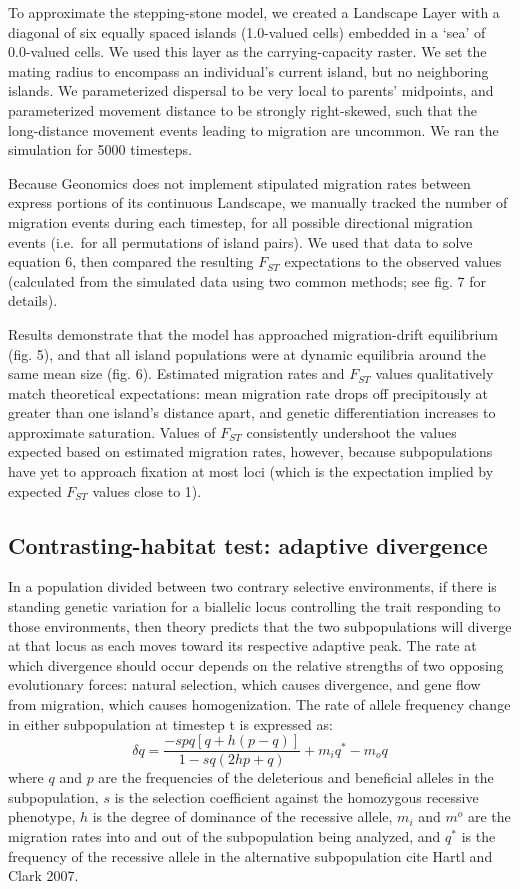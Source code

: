 ﻿\documentclass{article}
\begin{document}
To approximate the stepping-stone model, we created a Landscape Layer with a diagonal
of six equally spaced islands (1.0-valued cells) embedded in a `sea' of 0.0-valued cells.
We used this layer as the carrying-capacity raster.
We set the mating radius to encompass an individual's current island, but no neighboring islands.
We parameterized dispersal to be very local to parents' midpoints, and
parameterized movement distance to be strongly right-skewed, such that
the long-distance movement events leading to migration are uncommon.
We ran the simulation for 5000 timesteps.

Because Geonomics does not implement stipulated migration rates between
express portions of its continuous Landscape, we manually tracked the number of
migration events during each timestep, for all possible directional migration events 
(i.e.\ for all permutations of island pairs). 
We used that data to solve equation 6, then compared
the resulting $F_{ST}$ expectations to the observed values
(calculated from the simulated data using two common methods; see fig. 7 for details).

Results demonstrate that the model has approached migration-drift equilibrium
(fig. 5), and that all island populations were at dynamic equilibria around the
same mean size (fig. 6). 
Estimated migration rates and $F_{ST}$ values qualitatively match theoretical expectations:
mean migration rate drops off precipitously at greater than one island's distance apart, 
and genetic differentiation increases to approximate saturation.
Values of $F_{ST}$ consistently undershoot the values expected based on estimated
migration rates, however, because subpopulations have yet to approach fixation
at most loci (which is the expectation implied by expected $F_{ST}$ values
close to 1).


\subsection{Contrasting-habitat test: adaptive divergence}
In a population divided between two contrary selective environments, if there is
standing genetic variation for a biallelic locus controlling the trait responding
to those environments, then theory predicts that the two subpopulations will diverge at
that locus as each moves toward its respective adaptive peak.
The rate at which divergence should occur depends on the relative strengths
of two opposing evolutionary forces: natural selection, which causes divergence,
and gene flow from migration, which causes homogenization. 
The rate of allele frequency change
in either subpopulation at timestep t is expressed as:
\begin{equation}
\delta{q} = \frac{-spq[q + h(p - q)]}{1 - sq(2hp + q)} + m_{i}q^{*} - m_{o}q
\end{equation}
where $q$ and $p$ are the frequencies of the deleterious and beneficial alleles
in the subpopulation, $s$ is the selection
coefficient against the homozygous recessive phenotype, $h$ is the degree of dominance
of the recessive allele, $m_{i}$ and $m^{o}$ are the migration rates into and out of
the subpopulation being analyzed, and $q^{*}$ is the frequency of the recessive allele
in the alternative subpopulation {\large cite Hartl and Clark 2007}.
\end{document}
